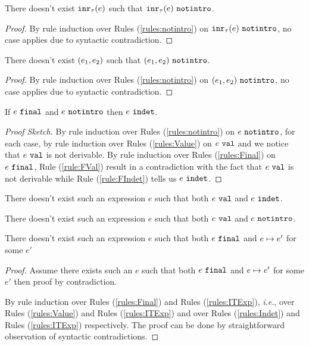 \begin{lemma}
  \label{lem:no-inr-notintro}
  There doesn't exist $\mathtt{inr}_{\tau}({e})$ such that $\mathtt{inr}_{\tau}({e}) ~\mathtt{notintro}$.
\end{lemma}
\begin{proof}
    By rule induction over Rules (\ref{rules:notintro}) on $\mathtt{inr}_{\tau}({e}) ~\mathtt{notintro}$, no case applies due to syntactic contradiction.
\end{proof}

\begin{lemma}
  \label{lem:no-pair-notintro}
  There doesn't exist $(e_1 , e_2)$ such that $(e_1 , e_2) ~\mathtt{notintro}$.
\end{lemma}
\begin{proof}
    By rule induction over Rules (\ref{rules:notintro}) on $(e_1 , e_2) ~\mathtt{notintro}$, no case applies due to syntactic contradiction.
\end{proof}

\begin{lemma}
  \label{lem:final-notintro-indet}
  If $e ~\mathtt{final}$ and $e ~\mathtt{notintro}$ then $e ~\mathtt{indet}$.
\end{lemma}
\begin{proof}[Proof Sketch]
By rule induction over Rules (\ref{rules:notintro}) on  $e ~\mathtt{notintro}$, for each case, by rule induction over Rules (\ref{rules:Value}) on $e ~\mathtt{val}$ and we notice that $e ~\mathtt{val}$ is not derivable. By rule induction over Rules (\ref{rules:Final}) on $e ~\mathtt{final}$, Rule (\ref{rule:FVal}) result in a contradiction with the fact that $e ~\mathtt{val}$ is not derivable while Rule (\ref{rule:FIndet}) tells us $e ~\mathtt{indet}$.
\end{proof}

\begin{lemma}
  \label{lem:val-not-indet}
  There doesn't exist such an expression $e$ such that both $e ~\mathtt{val}$ and $e ~\mathtt{indet}$.
\end{lemma}

\begin{lemma}
  \label{lem:val-not-notintro}
  There doesn't exist such an expression $e$ such that both $e ~\mathtt{val}$ and $e ~\mathtt{notintro}$.
\end{lemma}

\begin{lemma}[Finality]
  \label{lem:finality}
  There doesn't exist such an expression $e$ such that both $e ~\mathtt{final}$ and $e \mapsto e'$ for some $e'$
\end{lemma}
\begin{proof}Assume there exists such an $e$ such that both $e ~\mathtt{final}$ and $e \mapsto e'$ for some $e'$ then proof by contradiction.
 
  By rule induction over Rules (\ref{rules:Final}) and Rules (\ref{rules:ITExp}), \textit{i.e.}, over Rules (\ref{rules:Value}) and Rules (\ref{rules:ITExp}) and over Rules (\ref{rules:Indet}) and Rules (\ref{rules:ITExp}) respectively. The proof can be done by straightforward observation of syntactic contradictions.
\end{proof}

